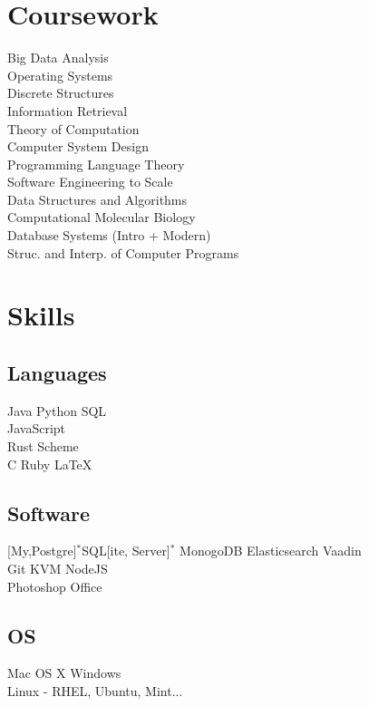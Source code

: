 \documentclass[]{deedy-resume}
\begin{document}
\begin{minipage}[t]{0.33\textwidth}
\sectionsep


\section{Coursework}
Big Data Analysis\\
Operating Systems\\
Discrete Structures\\
Information Retrieval\\
Theory of Computation\\
Computer System Design\\
Programming Language Theory\\
Software Engineering to Scale\\
Data Structures and Algorithms\\
Computational Molecular Biology\\
Database Systems (Intro + Modern)\\
Struc. and Interp. of Computer Programs\\
\sectionsep


\section{Skills}
\subsection{Languages}
Java \textbullet{}  
Python \textbullet{}
SQL \\
JavaScript \\
Rust \textbullet{}
Scheme \\
C \textbullet{}
Ruby \textbullet{}
\LaTeX\ \\ 

\subsection{Software}
[My,Postgre]$^*$SQL[ite, Server]$^*$
MonogoDB \textbullet{}
Elasticsearch \textbullet{}
Vaadin \\
Git \textbullet{}
KVM \textbullet{}
NodeJS \\
Photoshop \textbullet{}
Office \\

\subsection{OS}
Mac OS X \textbullet{}
Windows \\
Linux - RHEL, Ubuntu, Mint... \\


\end{minipage}
\end{document}
